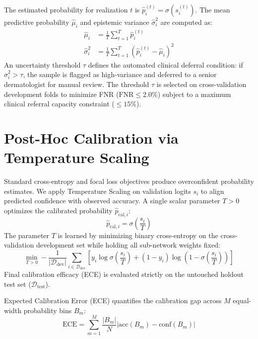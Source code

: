\documentclass[12pt,a4paper]{report}
\begin{document}
	The estimated probability for realization $t$ is $\hat{p}_i^{(t)} = \sigma(s_i^{(t)})$. The mean predictive probability $\hat{\mu}_i$ and epistemic variance $\hat{\sigma}_i^2$ are computed as:
	\begin{align}
		\hat{\mu}_i &= \frac{1}{T} \sum_{t=1}^T \hat{p}_i^{(t)} \\
		\hat{\sigma}_i^2 &= \frac{1}{T} \sum_{t=1}^T \left( \hat{p}_i^{(t)} - \hat{\mu}_i \right)^2
	\end{align}
	An uncertainty threshold $\tau$ defines the automated clinical deferral condition: if $\hat{\sigma}_i^2 > \tau$, the sample is flagged as high-variance and deferred to a senior dermatologist for manual review. The threshold $\tau$ is selected on cross-validation development folds to minimize FNR ($\text{FNR} \le 2.0\%$) subject to a maximum clinical referral capacity constraint ($\le 15\%$).
	
	\section{Post-Hoc Calibration via Temperature Scaling}
	Standard cross-entropy and focal loss objectives produce overconfident probability estimates. We apply Temperature Scaling on validation logits $s_i$ to align predicted confidence with observed accuracy. A single scalar parameter $T > 0$ optimizes the calibrated probability $\hat{p}_{\text{cal}, i}$:
	\begin{equation}
		\hat{p}_{\text{cal}, i} = \sigma\left( \frac{s_i}{T} \right)
	\end{equation}
	The parameter $T$ is learned by minimizing binary cross-entropy on the cross-validation development set while holding all sub-network weights fixed:
	\begin{equation}
		\min_{T > 0} -\frac{1}{|\mathcal{D}_{\text{dev}}|} \sum_{i \in \mathcal{D}_{\text{dev}}} \left[ y_i \log \sigma\left( \frac{s_i}{T} \right) + (1 - y_i) \log \left( 1 - \sigma\left( \frac{s_i}{T} \right) \right) \right]
	\end{equation}
	Final calibration efficacy (ECE) is evaluated strictly on the untouched holdout test set ($\mathcal{D}_{\text{test}}$).
	
	Expected Calibration Error (ECE) quantifies the calibration gap across $M$ equal-width probability bins $B_m$:
	\begin{equation}
		\text{ECE} = \sum_{m=1}^M \frac{|B_m|}{N} \left| \text{acc}(B_m) - \text{conf}(B_m) \right|
	\end{equation}
	
\end{document}

